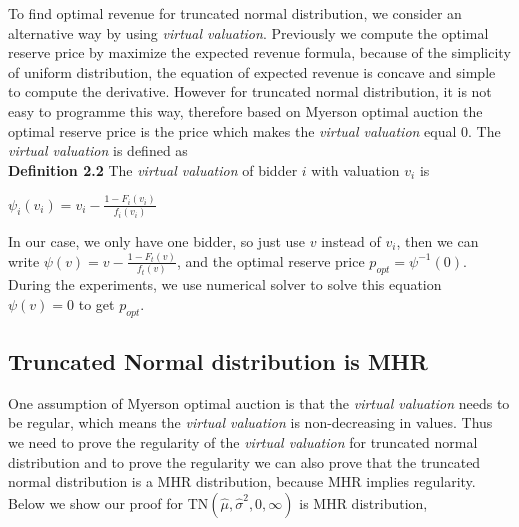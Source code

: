 To find optimal revenue for truncated normal distribution, we consider an alternative way by using \textit{virtual valuation}. Previously we compute the optimal reserve price by maximize the expected revenue formula, because of the simplicity of uniform distribution, the equation of expected revenue is concave and simple to compute the derivative. However for truncated normal distribution, it is not easy to programme this way, therefore based on Myerson optimal auction the optimal reserve price is the price which makes the \textit{virtual valuation} equal 0. The \textit{virtual valuation} is defined as\\
\textbf{Definition 2.2} The \textit{virtual valuation} of bidder $i$ with valuation $v_i$ is 
\begin{center}
	$\psi_i(v_i) = v_i - \frac{1-F_i(v_i)}{f_i(v_i)}$ 
\end{center}
In our case, we only have one bidder, so just use $v$ instead of $v_i$, then we can write $\psi(v) = v - \frac{1-F_t (v)}{f_t (v)}$, and the optimal reserve price $p_{opt} = \psi^{-1}(0)$. During the experiments, we use numerical solver to solve this equation $\psi(v) = 0$ to get $p_{opt}$.

\subsection{Truncated Normal distribution is MHR}
One assumption of Myerson optimal auction is that the \textit{virtual valuation} needs to be regular, which means the \textit{virtual valuation} is non-decreasing in values. Thus we need to prove the regularity of the \textit{virtual valuation} for truncated normal distribution and to prove the regularity we can also prove that the truncated normal distribution is a MHR distribution, because MHR implies regularity. Below we show our proof for TN$(\hat{\mu}, \hat{\sigma}^2, 0, \infty)$ is MHR distribution,

